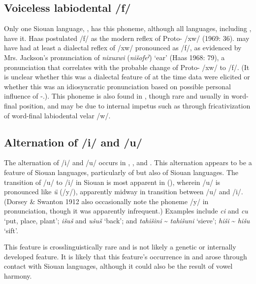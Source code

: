 \documentclass[output=paper]{LSP/langsci}
\begin{document}
\subsection{Voiceless labiodental  /f/}

Only one Siouan language, , has this phoneme, although all  languages, including , have it. Haas postulated  /f/ as the modern reflex of Proto- /xw/ (1969: 36).  may have had at least a dialectal reflex of /xw/ pronounced as /f/, as evidenced by Mrs. Jackson’s pronunciation of \emph{nixuxwi} (\emph{nišofeˀ}) `ear' (Haas 1968: 79), a pronunciation that correlates with the probable change of Proto- /xw/ to /f/. (It is unclear whether this was a dialectal feature of  at the time data were elicited or whether this was an idiosyncratic pronunciation based on possible personal influence of -.). This phoneme is also found in , though rare and usually in word-final position, and may be due to internal impetus such as through fricativization of word-final labiodental velar /w/.

\subsection{Alternation of /i/ and /u/}
	
The alternation of /i/ and /u/ occurs in , , and . This alternation appears to be a feature of Siouan languages, particularly of  but also of  Siouan languages. The transition of /u/ to /i/ in Siouan is most apparent in  (), wherein /u/ is pronounced like  \emph{ü} (/y/), apparently midway in transition between /u/ and /i/. (Dorsey \& Swanton 1912 also occasionally note the phoneme /y/ in  pronunciation, though it was apparently infrequent.) Examples include  \emph{ci} and \emph{cu} `put, place, plant';  \emph{išuš} and \emph{ušuš} `back'; and  \emph{tahišini} \textasciitilde{} \emph{tahišuni} `sieve';  \emph{hiši} \textasciitilde{} \emph{hišu} `sift'.

This feature is crosslinguistically rare and is not likely a genetic or internally developed feature. It is likely that this feature’s occurrence in  and  arose through contact with Siouan languages, although it could also be the result of vowel harmony. 
\end{document}
